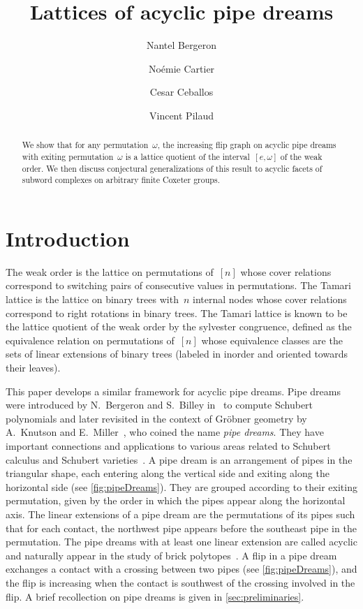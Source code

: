 \documentclass[reqno]{amsart}
\title{Lattices of acyclic pipe dreams}
\author[N.~Bergeron]{Nantel Bergeron}
\author[N.~Cartier]{No\'emie Cartier}
\author[C.~Ceballos]{Cesar Ceballos}
\author[V.~Pilaud]{Vincent Pilaud}
\theoremstyle{definition}
\begin{document}
\begin{abstract}
We show that for any permutation~$\omega$, the increasing flip graph on acyclic pipe dreams with exiting permutation~$\omega$ is a lattice quotient of the interval~$[e,\omega]$ of the weak order.
We then discuss conjectural generalizations of this result to acyclic facets of subword complexes on arbitrary finite Coxeter groups.
\end{abstract}

\vspace*{-.8cm}

\maketitle

\tableofcontents


\section{Introduction}
\label{sec:introduction}

The weak order is the lattice on permutations of~$[n]$ whose cover relations correspond to switching pairs of consecutive values in permutations.
The Tamari lattice is the lattice on binary trees with~$n$ internal nodes whose cover relations correspond to right rotations in binary trees.
The Tamari lattice is known to be the lattice quotient of the weak order by the sylvester congruence, defined as the equivalence relation on permutations of~$[n]$ whose equivalence classes are the sets of linear extensions of binary trees (labeled in inorder and oriented towards their leaves).

This paper develops a similar framework for acyclic pipe dreams.
Pipe dreams were introduced by N.~Bergeron and S.~Billey in~\cite{BergeronBilley} to compute Schubert polynomials and later revisited in the context of Gr\"obner geometry by A.~Knutson and E.~Miller~\cite{KnutsonMiller-GroebnerGeometry}, who coined the name \emph{pipe dreams}.
They have important connections and applications to various areas related to Schubert calculus and Schubert varieties~\cite{LascouxSchutzenberger-PolynomesSchubert, LascouxSchutzenberger-SchubertLittlewoudRichardson}. 
A pipe dream is an arrangement of pipes in the triangular shape, each entering along the vertical side and exiting along the horizontal side (see \cref{fig:pipeDreams}).
They are grouped according to their exiting permutation, given by the order in which the pipes appear along the horizontal axis.
The linear extensions of a pipe dream are the permutations of its pipes such that for each contact, the northwest pipe appears before the southeast pipe in the permutation.
The pipe dreams with at least one linear extension are called acyclic and naturally appear in the study of brick polytopes~\cite{PilaudSantos-brickPolytope}.
A flip in a pipe dream exchanges a contact with a crossing between two pipes (see \cref{fig:pipeDreams}), and the flip is increasing when the contact is southwest of the crossing involved in the flip.
A brief recollection on pipe dreams is given in \cref{sec:preliminaries}.
\end{document}
